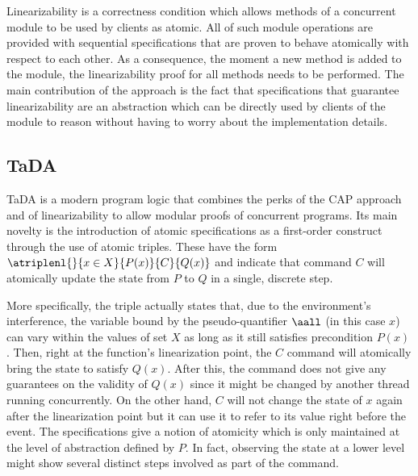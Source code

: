 Linearizability \cite{linearizability} is a correctness condition which allows methods of a concurrent module to be used by clients as atomic. All of such module operations are provided with sequential specifications that are proven to behave atomically with respect to each other. As a consequence, the moment a new method is added to the module, the linearizability proof for all methods needs to be performed. The main contribution of the approach is the fact that specifications that guarantee linearizability are an abstraction which can be directly used by clients of the module to reason without having to worry about the implementation details.

\subsection{TaDA} \label{s:tada}

TaDA \cite{tada} is a modern program logic that combines the perks of the CAP approach and of linearizability to allow modular proofs of concurrent programs. Its main novelty is the introduction of atomic specifications as a first-order construct through the use of atomic triples. These have the form $\atriplenl{}{x \in X}{P(x)}{C}{Q(x)}$ and indicate that command $C$ will atomically update the state from $P$ to $Q$ in a single, discrete step.

\begin{center}
\end{center}

More specifically, the triple actually states that, due to the environment's interference, the variable bound by the pseudo-quantifier $\aall$ (in this case $x$) can vary within the values of set $X$ as long as it still satisfies precondition $P(x)$. Then, right at the function's linearization point, the $C$ command will atomically bring the state to satisfy $Q(x)$. After this, the command does not give any guarantees on the validity of $Q(x)$ since it might be changed by another thread running concurrently. On the other hand, $C$ will not change the state of $x$ again after the linearization point but it can use it to refer to its value right before the event. The specifications give a notion of atomicity which is only maintained at the level of abstraction defined by $P$. In fact, observing the state at a lower level might show several distinct steps involved as part of the command.

